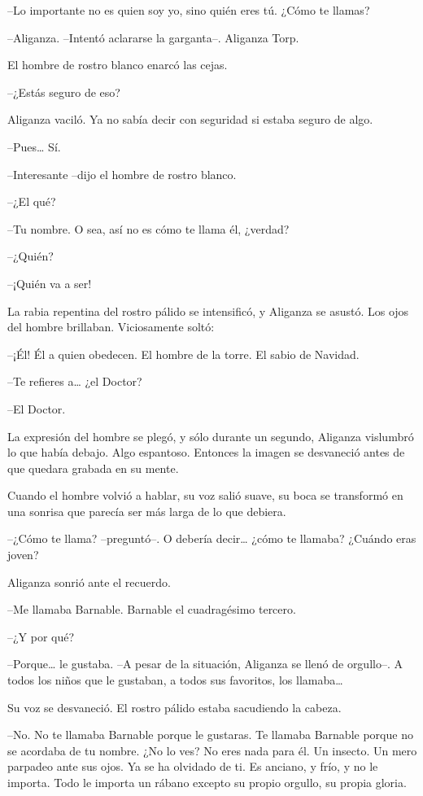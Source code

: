 --Lo importante no es quien soy yo, sino quién eres tú. ¿Cómo te llamas?

--Aliganza. --Intentó aclararse la garganta--. Aliganza Torp.

El hombre de rostro blanco enarcó las cejas.

--¿Estás seguro de eso?

Aliganza vaciló. Ya no sabía decir con seguridad si estaba seguro de algo.

--Pues… Sí.

--Interesante --dijo el hombre de rostro blanco.

--¿El qué?

--Tu nombre. O sea, así no es cómo te llama él, ¿verdad?

--¿Quién?

--¡Quién va a ser!

La rabia repentina del rostro pálido se intensificó, y Aliganza se asustó. Los ojos del hombre brillaban. Viciosamente soltó:

--¡Él! Él a quien obedecen. El hombre de la torre. El sabio de Navidad.

--Te refieres a… ¿el Doctor?

--El Doctor.

La expresión del hombre se plegó, y sólo durante un segundo, Aliganza vislumbró lo que había debajo. Algo espantoso. Entonces la imagen se desvaneció antes de que quedara grabada en su mente.

Cuando el hombre volvió a hablar, su voz salió suave, su boca se transformó en una sonrisa que parecía ser más larga de lo que debiera.

--¿Cómo te llama? --preguntó--. O debería decir… ¿cómo te llamaba? ¿Cuándo eras joven?

Aliganza sonrió ante el recuerdo.

--Me llamaba Barnable. Barnable el cuadragésimo tercero.

--¿Y por qué?

--Porque… le gustaba. --A pesar de la situación, Aliganza se llenó de orgullo--. A todos los niños que le gustaban, a todos sus favoritos, los llamaba…

Su voz se desvaneció. El rostro pálido estaba sacudiendo la cabeza.

--No. No te llamaba Barnable porque le gustaras. Te llamaba Barnable porque no se acordaba de tu nombre. ¿No lo ves? No eres nada para él. Un insecto. Un mero parpadeo ante sus ojos. Ya se ha olvidado de ti. Es anciano, y frío, y no le importa. Todo le importa un rábano excepto su propio orgullo, su propia gloria.


